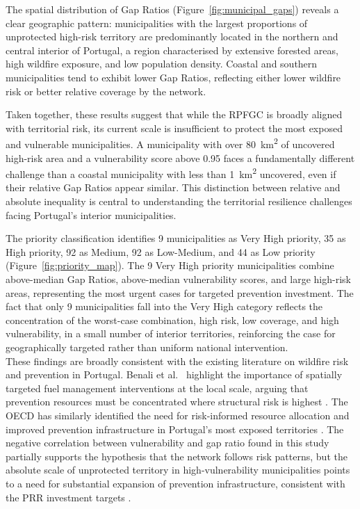 The spatial distribution of Gap Ratios
(Figure~\ref{fig:municipal_gaps}) reveals a clear geographic
pattern: municipalities with the largest proportions of
unprotected high-risk territory are predominantly located in
the northern and central interior of Portugal, a region
characterised by extensive forested areas, high wildfire
exposure, and low population density. Coastal and southern
municipalities tend to exhibit lower Gap Ratios, reflecting
either lower wildfire risk or better relative coverage by
the network.

Taken together, these results suggest that while the RPFGC
is broadly aligned with territorial risk, its current scale
is insufficient to protect the most exposed and vulnerable
municipalities. A municipality with over 80~km\textsuperscript{2}
of uncovered high-risk area and a vulnerability score above
0.95 faces a fundamentally different challenge than a coastal
municipality with less than 1~km\textsuperscript{2} uncovered,
even if their relative Gap Ratios appear similar. This
distinction between relative and absolute inequality is
central to understanding the territorial resilience challenges
facing Portugal's interior municipalities.

The priority classification identifies 9 municipalities as Very
High priority, 35 as High priority, 92 as Medium, 92 as
Low-Medium, and 44 as Low priority (Figure~\ref{fig:priority_map}).
The 9 Very High priority municipalities combine above-median Gap
Ratios, above-median vulnerability scores, and large high-risk
areas, representing the most urgent cases for targeted prevention
investment. The fact that only 9 municipalities fall into the Very
High category reflects the concentration of the worst-case
combination, high risk, low coverage, and high vulnerability,
in a small number of interior territories, reinforcing the case
for geographically targeted rather than uniform national
intervention.\\



These findings are broadly consistent with the existing
literature on wildfire risk and prevention in Portugal.
Benali et al.\ \cite{FrontiersPortugal2023} highlight the importance
of spatially targeted fuel management interventions at the
local scale, arguing that prevention resources must be
concentrated where structural risk is highest
\cite{FrontiersPortugal2023}. The OECD has similarly
identified the need for risk-informed resource allocation
and improved prevention infrastructure in Portugal's most
exposed territories \cite{OECD2023Portugal}. The negative
correlation between vulnerability and gap ratio found in
this study partially supports the hypothesis that the
network follows risk patterns, but the absolute scale of
unprotected territory in high-vulnerability municipalities
points to a need for substantial expansion of prevention
infrastructure, consistent with the PRR investment targets
\cite{Transparencia_C08}.






